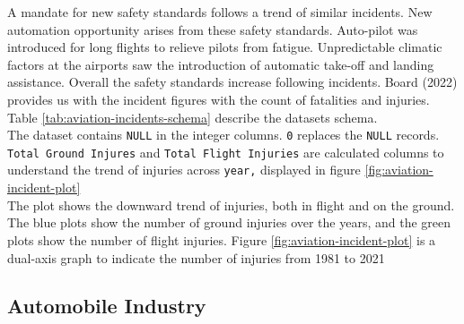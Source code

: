 \documentclass[
  man,floatsintext]{apa7}
\begin{document}
A mandate for new safety standards follows a trend of similar incidents. New automation opportunity arises from these safety standards. Auto-pilot was introduced for long flights to relieve pilots from fatigue. Unpredictable climatic factors at the airports saw the introduction of automatic take-off and landing assistance. Overall the safety standards increase following incidents. Board (2022) provides us with the incident figures with the count of fatalities and injuries. Table \ref{tab:aviation-incidents-schema} describe the datasets schema.\\

The dataset contains \texttt{NULL} in the integer columns. \texttt{0} replaces the \texttt{NULL} records. \texttt{Total\ Ground\ Injures} and \texttt{Total\ Flight\ Injuries} are calculated columns to understand the trend of injuries across \texttt{year,} displayed in figure \ref{fig:aviation-incident-plot}\\

The plot shows the downward trend of injuries, both in flight and on the ground. The blue plots show the number of ground injuries over the years, and the green plots show the number of flight injuries. Figure \ref{fig:aviation-incident-plot} is a dual-axis graph to indicate the number of injuries from 1981 to 2021\\

\hypertarget{automobile-industry}{%
\subsection{Automobile Industry}\label{automobile-industry}}
\end{document}
